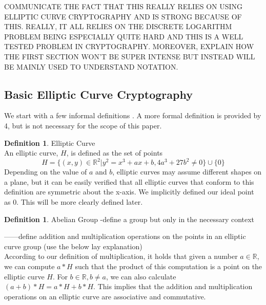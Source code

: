 \documentclass{amsart}
\theoremstyle{definition}
\newtheorem{definition}[thm]{Definition}
\numberwithin{equation}{section}
\begin{document}
COMMUNICATE THE FACT THAT THIS REALLY RELIES ON USING ELLIPTIC CURVE CRYPTOGRAPHY AND IS STRONG BECAUSE OF THIS. REALLY, IT ALL RELIES ON THE DISCRETE LOGARITHM PROBLEM BEING ESPECIALLY QUITE HARD AND THIS IS A WELL TESTED PROBLEM IN CRYPTOGRAPHY. MOREOVER, EXPLAIN HOW THE FIRST SECTION WON'T BE SUPER INTENSE BUT INSTEAD WILL BE MAINLY USED TO UNDERSTAND NOTATION.\\

\subsection{Basic Elliptic Curve Cryptography}
We start with a few informal definitions \cite{3}. A more formal definition is provided by {4}, but is not necessary for the scope of this paper.

\begin{definition}{Elliptic Curve}\\
An elliptic curve, $H$, is defined as the set of points
$$H = \{(x, y) \in \mathbb{R}^{2} | y^{2} = x^{3} + ax + b, 4a^{3} + 27b^{2} \neq 0\} \cup \{0\}$$
Depending on the value of $a$ and $b$, elliptic curves may assume different shapes on a plane, but it can be easily verified that all elliptic curves that conform to this definition are symmetric about the x-axis. We implicitly defined our ideal point as ${0}$. This will be more clearly defined later.
\end{definition}

\begin{definition}{Abelian Group}
-define a group but only in the necessary context
\end{definition}

------define addition and multiplication operations on the points in an elliptic curve group (use the below lay explanation)\\

According to our definition of multiplication, it holds that given a number $a \in \mathbb{R}$, we can compute $a*H$ such that the product of this computation is a point on the elliptic curve $H$. For $b \in \mathbb{R}, b \neq a$, we can also calculate $(a+b)*H = a*H + b*H$. This implies that the addition and multiplication operations on an elliptic curve are associative and commutative. \\
\end{document}

